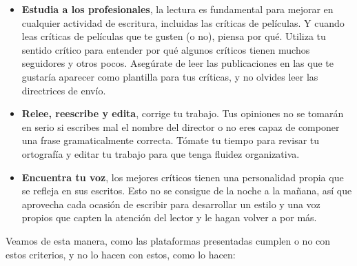 \begin{itemize}
\item \textbf{Estudia a los profesionales}, la lectura es fundamental para mejorar en cualquier actividad de escritura, incluidas las críticas de películas. Y cuando leas críticas de películas que te gusten (o no), piensa por qué. Utiliza tu sentido crítico para entender por qué algunos críticos tienen muchos seguidores y otros pocos. Asegúrate de leer las publicaciones en las que te gustaría aparecer como plantilla para tus críticas, y no olvides leer las directrices de envío.
\item \textbf{Relee, reescribe y edita}, corrige tu trabajo. Tus opiniones no se tomarán en serio si escribes mal el nombre del director o no eres capaz de componer una frase gramaticalmente correcta. Tómate tu tiempo para revisar tu ortografía y editar tu trabajo para que tenga fluidez organizativa.
\item \textbf{Encuentra tu voz}, los mejores críticos tienen una personalidad propia que se refleja en sus escritos. Esto no se consigue de la noche a la mañana, así que aprovecha cada ocasión de escribir para desarrollar un estilo y una voz propios que capten la atención del lector y le hagan volver a por más.
\end{itemize}

Veamos de esta manera, como las plataformas presentadas cumplen o no con estos criterios, y no lo hacen con estos, como lo hacen:


